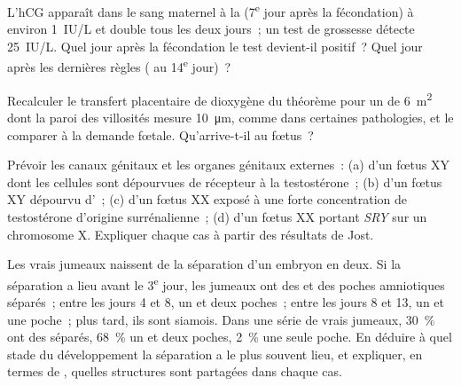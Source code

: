 \begin{exercise}[$\star\star$]\label{exo:b2:mammal-reproduction:8}
L'hCG apparaît dans le sang maternel à la  (7\textsuperscript{e}
jour après la fécondation) à environ \qty{1}{IU/L} et double tous les
deux jours~; un test de grossesse détecte \qty{25}{IU/L}. Quel jour après
la fécondation le test devient-il positif~? Quel jour après les
dernières règles ( au 14\textsuperscript{e} jour)~?
\end{exercise}

\begin{exercise}[$\star\star$]\label{exo:b2:mammal-reproduction:9}
Recalculer le transfert placentaire de dioxygène du théorème pour un
 de \qty{6}{m^2} dont la paroi des villosités mesure
\qty{10}{\micro m}, comme dans certaines pathologies, et le comparer à
la demande fœtale. Qu'arrive-t-il au fœtus~?
\end{exercise}

\begin{exercise}[$\star\star\star$]\label{exo:b2:mammal-reproduction:10}
Prévoir les canaux génitaux et les organes génitaux externes~: (a) d'un
fœtus XY dont les cellules sont dépourvues de récepteur à la
testostérone~; (b) d'un fœtus XY dépourvu d'~;
(c) d'un fœtus XX exposé à une forte concentration de testostérone
d'origine surrénalienne~; (d) d'un fœtus XX portant \emph{SRY} sur un
chromosome X. Expliquer chaque cas à partir des résultats de Jost.
\end{exercise}

\begin{exercise}[$\star\star\star$]\label{exo:b2:mammal-reproduction:11}
Les vrais jumeaux naissent de la séparation d'un embryon en deux. Si la
séparation a lieu avant le 3\textsuperscript{e} jour, les jumeaux ont
des  et des poches amniotiques séparés~; entre les jours 4 et
8, un  et deux poches~; entre les jours 8 et 13, un  et
une poche~; plus tard, ils sont siamois. Dans une série de vrais
jumeaux, \qty{30}{\%} ont des  séparés, \qty{68}{\%} un
 et deux poches, \qty{2}{\%} une seule poche. En déduire à quel
stade du développement la séparation a le plus souvent lieu, et
expliquer, en termes de , quelles structures sont partagées
dans chaque cas.
\end{exercise}

